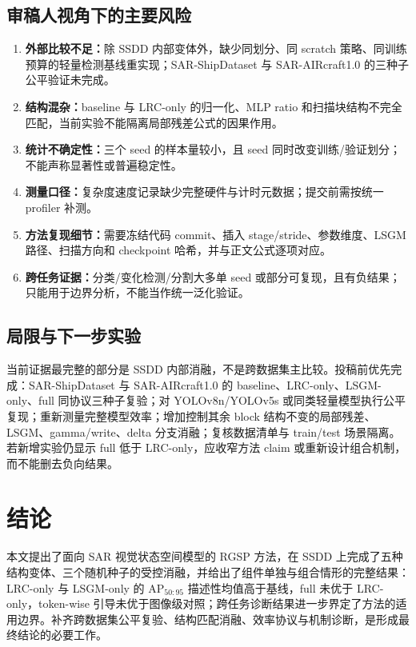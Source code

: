 \documentclass[UTF8,12pt,a4paper]{ctexart}
\begin{document}
\subsection{审稿人视角下的主要风险}
\begin{enumerate}
\item \textbf{外部比较不足：}除 SSDD 内部变体外，缺少同划分、同 scratch 策略、同训练预算的轻量检测基线重实现；SAR-ShipDataset 与 SAR-AIRcraft1.0 的三种子公平验证未完成。
\item \textbf{结构混杂：}baseline 与 LRC-only 的归一化、MLP ratio 和扫描块结构不完全匹配，当前实验不能隔离局部残差公式的因果作用。
\item \textbf{统计不确定性：}三个 seed 的样本量较小，且 seed 同时改变训练/验证划分；不能声称显著性或普遍稳定性。
\item \textbf{测量口径：}复杂度速度记录缺少完整硬件与计时元数据；提交前需按统一 profiler 补测。
\item \textbf{方法复现细节：}需要冻结代码 commit、插入 stage/stride、参数维度、LSGM 路径、扫描方向和 checkpoint 哈希，并与正文公式逐项对应。
\item \textbf{跨任务证据：}分类/变化检测/分割大多单 seed 或部分可复现，且有负结果；只能用于边界分析，不能当作统一泛化验证。
\end{enumerate}

\subsection{局限与下一步实验}
当前证据最完整的部分是 SSDD 内部消融，不是跨数据集主比较。投稿前优先完成：SAR-ShipDataset 与 SAR-AIRcraft1.0 的 baseline、LRC-only、LSGM-only、full 同协议三种子复验；对 YOLOv8n/YOLOv5s 或同类轻量模型执行公平复现；重新测量完整模型效率；增加控制其余 block 结构不变的局部残差、LSGM、gamma/write、delta 分支消融；复核数据清单与 train/test 场景隔离。若新增实验仍显示 full 低于 LRC-only，应收窄方法 claim 或重新设计组合机制，而不能删去负向结果。

\section{结论}
本文提出了面向 SAR 视觉状态空间模型的 RGSP 方法，在 SSDD 上完成了五种结构变体、三个随机种子的受控消融，并给出了组件单独与组合情形的完整结果：LRC-only 与 LSGM-only 的 AP$_{50:95}$ 描述性均值高于基线，full 未优于 LRC-only，token-wise 引导未优于图像级对照；跨任务诊断结果进一步界定了方法的适用边界。补齐跨数据集公平复验、结构匹配消融、效率协议与机制诊断，是形成最终结论的必要工作。
\end{document}
